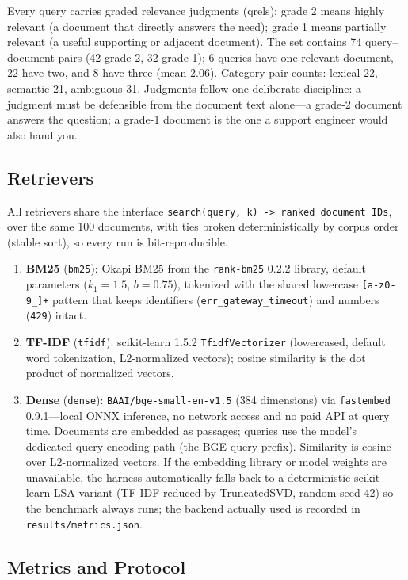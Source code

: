 \documentclass[11pt,a4paper]{article}
\newcommand{\code}[1]{\texttt{#1}}
\newcommand{\pkg}[1]{\texttt{#1}}
\begin{document}
Every query carries graded relevance judgments (qrels): grade 2 means highly relevant (a document that directly answers the need); grade 1 means partially relevant (a useful supporting or adjacent document). The set contains 74 query--document pairs (42 grade-2, 32 grade-1); 6 queries have one relevant document, 22 have two, and 8 have three (mean 2.06). Category pair counts: lexical 22, semantic 21, ambiguous 31. Judgments follow one deliberate discipline: a judgment must be defensible from the document text alone---a grade-2 document answers the question; a grade-1 document is the one a support engineer would also hand you.

\subsection{Retrievers}

All retrievers share the interface \code{search(query, k) -> ranked document IDs}, over the same 100 documents, with ties broken deterministically by corpus order (stable sort), so every run is bit-reproducible.

\begin{enumerate}[leftmargin=1.6em, itemsep=2pt]
    \item \textbf{BM25} (\code{bm25}): Okapi BM25 from the \pkg{rank-bm25} 0.2.2 library, default parameters ($k_1 = 1.5$, $b = 0.75$), tokenized with the shared lowercase \code{[a-z0-9\_]+} pattern that keeps identifiers (\code{err\_gateway\_timeout}) and numbers (\code{429}) intact.
    \item \textbf{TF-IDF} (\code{tfidf}): scikit-learn 1.5.2 \code{TfidfVectorizer} (lowercased, default word tokenization, L2-normalized vectors); cosine similarity is the dot product of normalized vectors.
    \item \textbf{Dense} (\code{dense}): \code{BAAI/bge-small-en-v1.5} (384 dimensions) via \pkg{fastembed} 0.9.1---local ONNX inference, no network access and no paid API at query time. Documents are embedded as passages; queries use the model's dedicated query-encoding path (the BGE query prefix). Similarity is cosine over L2-normalized vectors. If the embedding library or model weights are unavailable, the harness automatically falls back to a deterministic scikit-learn LSA variant (TF-IDF reduced by TruncatedSVD, random seed 42) so the benchmark always runs; the backend actually used is recorded in \code{results/metrics.json}.
\end{enumerate}

\subsection{Metrics and Protocol}
\end{document}
